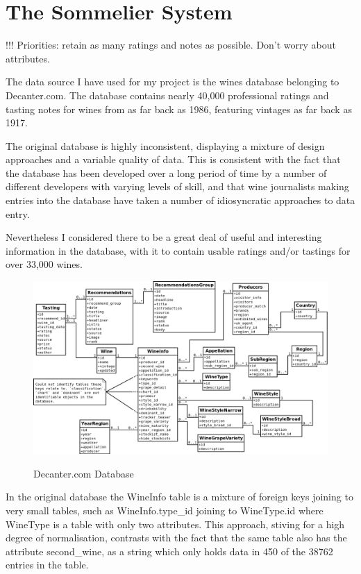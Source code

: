 \section{The Sommelier System}\label{design}


!!! Priorities: retain as many ratings and notes as possible. Don't worry about attributes.

The data source I have used for my project is the wines database belonging to Decanter.com\cite{DecanterCom}. The database contains nearly 40,000 professional ratings and tasting notes for wines from as far back as 1986, featuring vintages as far back as 1917.

The original database is highly inconsistent, displaying a mixture of design approaches and a variable quality of data. This is consistent with the fact that the database has been developed over a long period of time by a number of different developers with varying levels of skill, and that wine journalists making entries into the database have taken a number of idiosyncratic approaches to data entry.

Nevertheless I considered there to be a great deal of useful and interesting information in the database, with it to contain usable ratings and/or tastings for over 33,000 wines.


\begin{figure}[h!]
    \caption{Decanter.com Database}
    \centering
        \includegraphics[width=14cm]{DecanterWineDB}
    \label{fig:decanterdb}
\end{figure}

In the original database the WineInfo table is a mixture of foreign keys joining to very small tables, such as WineInfo.type\_id joining to WineType.id where WineType is a table with only two attributes. This approach, stiving for a high degree of normalisation, contrasts with the fact that the same table also has the attribute second\_wine, as a string which only holds data in 450 of the 38762 entries in the table.

